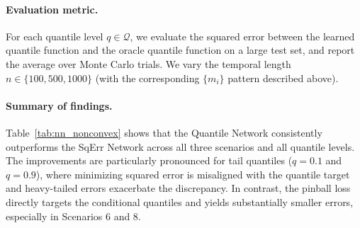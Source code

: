 \documentclass[twoside,11pt]{article}
\begin{document}
\paragraph{Evaluation metric.}
For each quantile level $q\in\mathcal{Q}$, we evaluate the squared error between the learned quantile function and the oracle quantile function on a large test set, and report the average over Monte Carlo trials.
We vary the temporal length $n\in\{100,500,1000\}$ (with the corresponding $\{m_i\}$ pattern described above).

\paragraph{Summary of findings.}
Table~\ref{tab:nn_nonconvex} shows that the Quantile Network consistently outperforms the SqErr Network across all three scenarios and all quantile levels.
The improvements are particularly pronounced for tail quantiles ($q=0.1$ and $q=0.9$), where minimizing squared error is misaligned with the quantile target and heavy-tailed errors exacerbate the discrepancy.
In contrast, the pinball loss directly targets the conditional quantiles and yields substantially smaller errors, especially in Scenarios 6 and 8.
\end{document}

